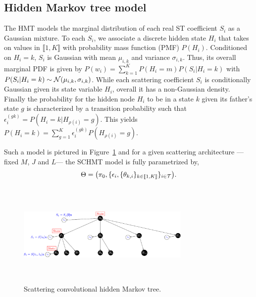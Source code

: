 \documentclass{article}
\begin{document}
  \vspace{-5pt}
  \subsection{Hidden Markov tree model}
    \label{subsec:SCHMT/HMT model}
    \vspace{-5pt}
    The HMT models the marginal distribution of each real ST coefficient $S_i$ as a Gaussian mixture. To each $S_i$, we associate a discrete hidden state $H_i$ that takes on values in $\llbracket 1,K \rrbracket$ with probability mass function (PMF) $P(H_i)$. Conditioned on $H_i = k$, $S_i$ is Gaussian with mean $\mu_{i,k}$ and variance $\sigma_{i,k}$. Thus, its overall marginal PDF is given by $P(w_i) = \sum_{k=1}^{K} P(H_i = m)P(S_i| H_i=k)$ with $P(S_i|H_i=k) \sim \mathcal{N}(\mu_{i,k}, \sigma_{i,k})$. While each scattering coefficient $S_i$ is conditionally Gaussian given its state variable $H_i$, overall it has a non-Gaussian density. Finally the probability for the hidden node $H_{i}$ to be in a state $k$ given its father's state $g$ is characterized by a transition probability such that $\epsilon_{i}^{(gk)} = P(H_{i}= k | H_{\rho(i)}=g)$. This yields $P(H_{i}=k) = \sum_{g=1}^{K} \epsilon_{i}^{(gk)} P(H_{\rho(i)}=g)$.

    Such a model is pictured in Figure~\ref{fig:SCHMT 1} and for a given scattering architecture ---\ie fixed $M$, $J$ and $L$--- the SCHMT model is fully parametrized by,
    \vspace{-5pt}
    \begin{equation}
      \Theta = \big(\pi_{0}, \{ \epsilon_{i}, \{ \theta_{k,i} \}_{k\in\llbracket1,K\rrbracket} \}_{i\in\mathcal{T}}\big).
      \label{eq:SCHMT - parameters}
    \end{equation}
    \vspace{-15pt}

    \begin{figure}
      \begin{center}
        \includegraphics[width=3.3in, height=2in, keepaspectratio]{scat_HMT_crop.pdf}
        \caption{Scattering convolutional hidden Markov tree.}
        \label{fig:SCHMT 1}
      \end{center}
      \vspace{-15pt}
    \end{figure}
    
\end{document}
